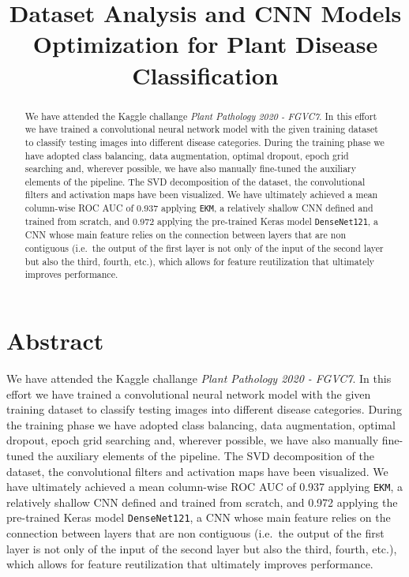 \documentclass{acm_proc_article-sp}
\title{Dataset Analysis and CNN Models Optimization for Plant Disease
Classification}
\author{
\alignauthor Claudio Moroni \\
        \affaddr{University of Turin}\\
       \email{\href{mailto:claudio.moroni@edu.unito.it}{\nolinkurl{claudio.moroni@edu.unito.it}}}
\and \alignauthor Pietro Monticone \\
        \affaddr{University of Turin}\\
       \email{\href{mailto:pietro.monticone@edu.unito.it}{\nolinkurl{pietro.monticone@edu.unito.it}}}
\and \alignauthor Davide Orsenigo \\
        \affaddr{University of Turin}\\
       \email{\href{mailto:davide.orsenigo@edu.unito.it}{\nolinkurl{davide.orsenigo@edu.unito.it}}}
\and }
\date{}
\begin{document}
\maketitle

\begin{abstract}
We have attended the Kaggle challange \emph{Plant Pathology 2020 -
FGVC7}. In this effort we have trained a convolutional neural network
model with the given training dataset to classify testing images into
different disease categories. During the training phase we have adopted
class balancing, data augmentation, optimal dropout, epoch grid
searching and, wherever possible, we have also manually fine-tuned the
auxiliary elements of the pipeline. The SVD decomposition of the
dataset, the convolutional filters and activation maps have been
visualized. We have ultimately achieved a mean column-wise ROC AUC of
0.937 applying \texttt{EKM}, a relatively shallow CNN defined and
trained from scratch, and 0.972 applying the pre-trained Keras model
\texttt{DenseNet121}, a CNN whose main feature relies on the connection
between layers that are non contiguous (i.e.~the output of the first
layer is not only of the input of the second layer but also the third,
fourth, etc.), which allows for feature reutilization that ultimately
improves performance.\\
\end{abstract}

\hypertarget{abstract}{%
\section{Abstract}\label{abstract}}

We have attended the Kaggle challange \emph{Plant Pathology 2020 -
FGVC7}. In this effort we have trained a convolutional neural network
model with the given training dataset to classify testing images into
different disease categories. During the training phase we have adopted
class balancing, data augmentation, optimal dropout, epoch grid
searching and, wherever possible, we have also manually fine-tuned the
auxiliary elements of the pipeline. The SVD decomposition of the
dataset, the convolutional filters and activation maps have been
visualized. We have ultimately achieved a mean column-wise ROC AUC of
0.937 applying \texttt{EKM}, a relatively shallow CNN defined and
trained from scratch, and 0.972 applying the pre-trained Keras model
\texttt{DenseNet121}, a CNN whose main feature relies on the connection
between layers that are non contiguous (i.e.~the output of the first
layer is not only of the input of the second layer but also the third,
fourth, etc.), which allows for feature reutilization that ultimately
improves performance.
\end{document}
